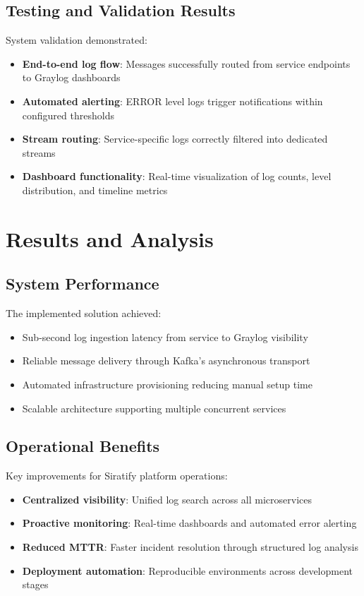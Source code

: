 \documentclass[12pt,a4paper]{report}
\begin{document}
\section{Testing and Validation Results}
System validation demonstrated:
\begin{itemize}[leftmargin=1.2cm]
  \item \textbf{End-to-end log flow}: Messages successfully routed from service endpoints to Graylog dashboards
  \item \textbf{Automated alerting}: ERROR level logs trigger notifications within configured thresholds
  \item \textbf{Stream routing}: Service-specific logs correctly filtered into dedicated streams
  \item \textbf{Dashboard functionality}: Real-time visualization of log counts, level distribution, and timeline metrics
\end{itemize}

\chapter{Results and Analysis}
\section{System Performance}
The implemented solution achieved:
\begin{itemize}[leftmargin=1.2cm]
  \item Sub-second log ingestion latency from service to Graylog visibility
  \item Reliable message delivery through Kafka's asynchronous transport
  \item Automated infrastructure provisioning reducing manual setup time
  \item Scalable architecture supporting multiple concurrent services
\end{itemize}

\section{Operational Benefits}
Key improvements for Siratify platform operations:
\begin{itemize}[leftmargin=1.2cm]
  \item \textbf{Centralized visibility}: Unified log search across all microservices
  \item \textbf{Proactive monitoring}: Real-time dashboards and automated error alerting
  \item \textbf{Reduced MTTR}: Faster incident resolution through structured log analysis
  \item \textbf{Deployment automation}: Reproducible environments across development stages
\end{itemize}
\end{document}

